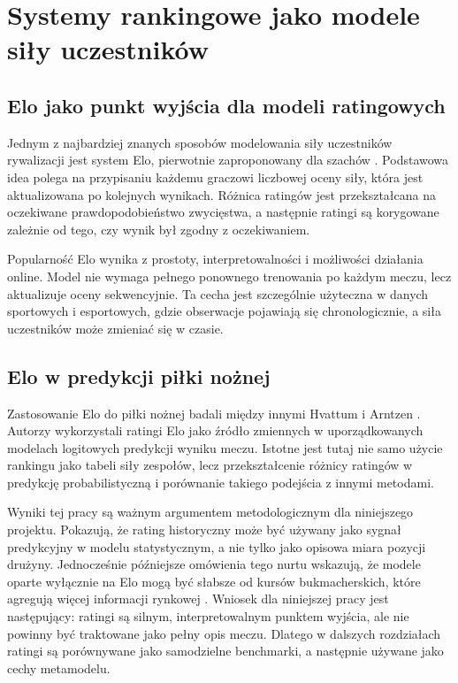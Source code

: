 \section{Systemy rankingowe jako modele siły uczestników}

\subsection{Elo jako punkt wyjścia dla modeli ratingowych}

Jednym z najbardziej znanych sposobów modelowania siły uczestników rywalizacji jest system Elo,
pierwotnie zaproponowany dla szachów \parencite{elo1978}. Podstawowa idea polega na przypisaniu
każdemu graczowi liczbowej oceny siły, która jest aktualizowana po kolejnych wynikach. Różnica
ratingów jest przekształcana na oczekiwane prawdopodobieństwo zwycięstwa, a następnie ratingi są
korygowane zależnie od tego, czy wynik był zgodny z oczekiwaniem.

Popularność Elo wynika z prostoty, interpretowalności i możliwości działania online. Model nie
wymaga pełnego ponownego trenowania po każdym meczu, lecz aktualizuje oceny sekwencyjnie. Ta cecha
jest szczególnie użyteczna w danych sportowych i esportowych, gdzie obserwacje pojawiają się
chronologicznie, a siła uczestników może zmieniać się w czasie.

\subsection{Elo w predykcji piłki nożnej}

Zastosowanie Elo do piłki nożnej badali między innymi Hvattum i Arntzen
\parencite{hvattum2010eloFootball}. Autorzy wykorzystali ratingi Elo jako źródło zmiennych w
uporządkowanych modelach logitowych predykcji wyniku meczu. Istotne jest tutaj nie samo użycie
rankingu jako tabeli siły zespołów, lecz przekształcenie różnicy ratingów w predykcję
probabilistyczną i porównanie takiego podejścia z innymi metodami.

Wyniki tej pracy są ważnym argumentem metodologicznym dla niniejszego projektu. Pokazują, że rating
historyczny może być używany jako sygnał predykcyjny w modelu statystycznym, a nie tylko jako
opisowa miara pozycji drużyny. Jednocześnie późniejsze omówienia tego nurtu wskazują, że modele
oparte wyłącznie na Elo mogą być słabsze od kursów bukmacherskich, które agregują więcej informacji
rynkowej \parencite{wunderlich2018bettingOddsRating}. Wniosek dla niniejszej pracy jest następujący:
ratingi są silnym, interpretowalnym punktem wyjścia, ale nie powinny być traktowane jako pełny opis
meczu. Dlatego w dalszych rozdziałach ratingi są porównywane jako samodzielne benchmarki, a
następnie używane jako cechy metamodelu.

